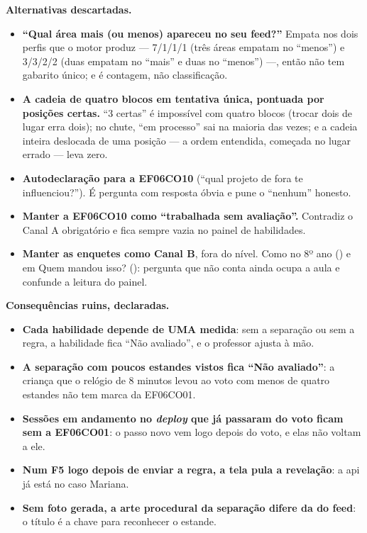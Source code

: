 \textbf{Alternativas descartadas.}

\begin{itemize}
  \item \textbf{\enquote{Qual área mais (ou menos) apareceu no seu feed?}}
    Empata nos dois perfis que o motor produz --- 7/1/1/1 (três áreas empatam
    no \enquote{menos}) e 3/3/2/2 (duas empatam no \enquote{mais} e duas no
    \enquote{menos}) ---, então não tem gabarito único; e é contagem, não
    classificação.
  \item \textbf{A cadeia de quatro blocos em tentativa única, pontuada por
    posições certas.} \enquote{3 certas} é impossível com quatro blocos (trocar
    dois de lugar erra dois); no chute, \enquote{em processo} sai na maioria
    das vezes; e a cadeia inteira deslocada de uma posição --- a ordem entendida,
    começada no lugar errado --- leva zero.
  \item \textbf{Autodeclaração para a EF06CO10} (\enquote{qual projeto de fora
    te influenciou?}). É pergunta com resposta óbvia e pune o \enquote{nenhum}
    honesto.
  \item \textbf{Manter a EF06CO10 como \enquote{trabalhada sem avaliação}.}
    Contradiz o Canal A obrigatório e fica sempre vazia no painel de
    habilidades.
  \item \textbf{Manter as enquetes como Canal B}, fora do nível. Como no 8º ano
    () e em Quem mandou isso? (): pergunta que não
    conta ainda ocupa a aula e confunde a leitura do painel.
\end{itemize}

\textbf{Consequências ruins, declaradas.}

\begin{itemize}
  \item \textbf{Cada habilidade depende de UMA medida}: sem a separação ou sem a
    regra, a habilidade fica \enquote{Não avaliado}, e o professor ajusta à
    mão.
  \item \textbf{A separação com poucos estandes vistos fica \enquote{Não
    avaliado}}: a criança que o relógio de 8 minutos levou ao voto com menos de
    quatro estandes não tem marca da EF06CO01.
  \item \textbf{Sessões em andamento no \emph{deploy} que já passaram do voto
    ficam sem a EF06CO01}: o passo novo vem logo depois do voto, e elas não
    voltam a ele.
  \item \textbf{Num F5 logo depois de enviar a regra, a tela pula a
    revelação}: a api já está no caso Mariana.
  \item \textbf{Sem foto gerada, a arte procedural da separação difere da do
    feed}: o título é a chave para reconhecer o estande.
\end{itemize}

